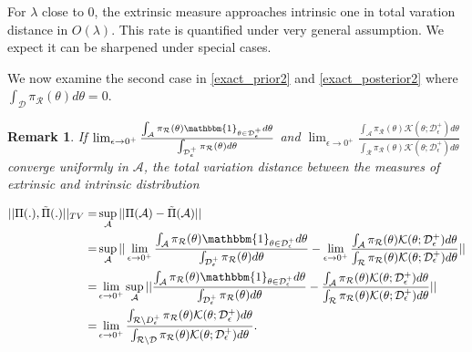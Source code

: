 \documentclass[10pt]{article}
\newtheorem{remark}{Remark}
\newcommand{\mc}[1]{\mathcal{#1}}
\DeclareMathOperator{\1}{\mathbbm{1}}
\begin{document}
For $\lambda$ close to $0$, the extrinsic measure approaches intrinsic one in total varation distance in $O(\lambda)$. This rate is quantified under very general assumption. We expect it can be sharpened under special cases.

We now examine the second case in \eqref{exact_prior2} and \eqref{exact_posterior2} where ${ \int_{\mc D} \pi_{\mc R}(\theta)d\theta }=0$.


\begin{remark}
If $\lim_{\epsilon\rightarrow 0^+} \frac{\int_{\mc A} \pi_{\mc R}(\theta) \mathbbm{1}_{\theta\in \mc D_\epsilon^+} d\theta}{ \int_{\mc D_\epsilon^+} \pi_{\mc R}(\theta)d\theta }$ and $ \lim_{\epsilon\rightarrow 0^+}\frac{\int_{\mc A} \pi_{\mc R}(\theta) \mc K({\theta; \mc D_\epsilon^+}) d\theta}{ \int_{\mc R} \pi_{\mc R}(\theta)  \mc K({\theta; \mc D_\epsilon^+}) d\theta }  $ converge uniformly in $\mc A$, the total variation distance between the measures of extrinsic and intrinsic distribution

\begin{equation}
	\begin{aligned}
	||\Pi(.), \tilde{\Pi}(.) ||_{TV}
	= &\sup_{\mc A} ||\Pi(\mc A)- \tilde{\Pi}(\mc A)||\\
	= & \sup_{\mc A}|| \lim_{\epsilon\rightarrow 0^+} \frac{\int_{\mc A} \pi_{\mc R}(\theta) \mathbbm{1}_{\theta\in \mc D_\epsilon^+} d\theta}{ \int_{\mc D_\epsilon^+} \pi_{\mc R}(\theta)d\theta }-  \lim_{\epsilon\rightarrow 0^+}\frac{\int_{\mc A} \pi_{\mc R}(\theta) \mc K({\theta; \mc D_\epsilon^+}) d\theta}{ \int_{\mc R} \pi_{\mc R}(\theta)  \mc K({\theta; \mc D_\epsilon^+}) d\theta } || \\
	= & \lim_{\epsilon\rightarrow 0^+} \sup_{\mc A}|| \frac{\int_{\mc A} \pi_{\mc R}(\theta) \mathbbm{1}_{\theta\in \mc D_\epsilon^+} d\theta}{ \int_{\mc D_\epsilon^+} \pi_{\mc R}(\theta)d\theta }-  \frac{\int_{\mc A} \pi_{\mc R}(\theta) \mc K({\theta; \mc D_\epsilon^+}) d\theta}{ \int_{\mc R} \pi_{\mc R}(\theta)  \mc K({\theta; \mc D_\epsilon^+}) d\theta } || \\
	=& \lim_{\epsilon\rightarrow 0^+}  \frac{\int_{\mc R \setminus \mc \mc D^+_\epsilon} \pi_{\mc R}(\theta) \mc K(\theta;\mc D^+_\epsilon)d\theta}{\int_{\mc R \setminus \mc D} \pi_{\mc R}(\theta) \mc K(\theta;\mc D^+_\epsilon)d\theta}.
	\end{aligned}
\end{equation}
\end{remark}
\end{document}
